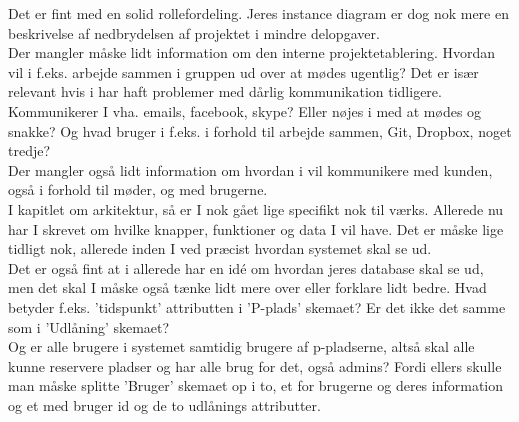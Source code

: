 \documentclass[12pt]{article}
\begin{document}
Det er fint med en solid rollefordeling. Jeres instance diagram er dog nok mere en beskrivelse af nedbrydelsen af projektet i mindre delopgaver.  \\
Der mangler måske lidt information om den interne projektetablering. Hvordan vil i f.eks. arbejde sammen i gruppen ud over at mødes ugentlig? Det er især relevant hvis i har haft problemer med dårlig kommunikation tidligere. 
Kommunikerer I vha. emails, facebook, skype? Eller nøjes i med at mødes og snakke? Og hvad bruger i f.eks. i forhold til arbejde sammen, Git, Dropbox, noget tredje? \\
Der mangler også lidt information om hvordan i vil kommunikere med kunden, også i forhold til møder, og med brugerne. \\

I kapitlet om arkitektur, så er I nok gået lige specifikt nok til værks. Allerede nu har I skrevet om hvilke knapper, funktioner og data I vil have. Det er måske lige tidligt nok, allerede inden I ved præcist hvordan systemet skal se ud. \\
Det er også fint at i allerede har en idé om hvordan jeres database skal se ud, men det skal I måske også tænke lidt mere over eller forklare lidt bedre. 
Hvad betyder f.eks. 'tidspunkt' attributten i 'P-plads' skemaet? Er det ikke det samme som i 'Udlåning' skemaet? \\
Og er alle brugere i systemet samtidig brugere af p-pladserne, altså skal alle kunne reservere pladser og har alle brug for det, også admins? Fordi ellers skulle man måske splitte 'Bruger' skemaet op i to, et for brugerne og deres information og et med bruger id og de to udlånings attributter. \\
\end{document}
